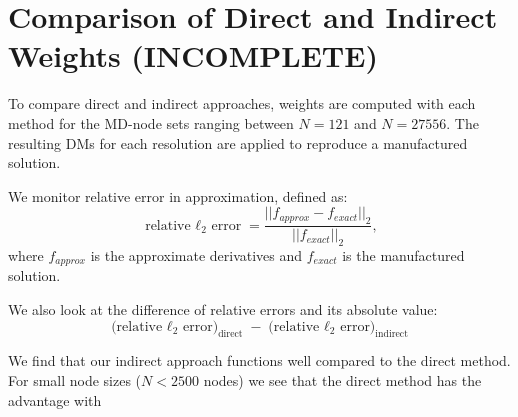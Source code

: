 \section{Comparison of Direct and Indirect Weights (INCOMPLETE)} 

To compare direct and indirect approaches, weights are computed with each method for the MD-node sets ranging between $N = 121$ and $N=27556$. The resulting DMs for each resolution are applied to reproduce a manufactured solution. 

We monitor relative error in approximation, defined as: 
$$ \text{relative $\ell_{2}$ error} = \frac{|| f_{approx} - f_{exact} ||_{2} }{ || f_{exact} ||_{2} }, $$ 
where $f_{approx}$ is the approximate derivatives and $f_{exact}$ is the manufactured solution. 


We also look at the difference of relative errors and its absolute value: 
$$
\text{(relative $\ell_{2}$ error)}_{\text{direct}} - \text{(relative $\ell_{2}$ error)}_{\text{indirect}}
$$

We find that our indirect approach functions well compared to the direct method. For small node sizes ($N < 2500$ nodes) we see that the direct method has the advantage with 


